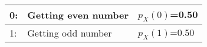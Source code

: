 \begin{tabular}{|l|l|l|}\hline
0:	 &Getting even number& $p_X(0)$=0.50\\\hline
1:	 &Getting odd number& $p_X(1)$=0.50 \\\hline
\end{tabular}
